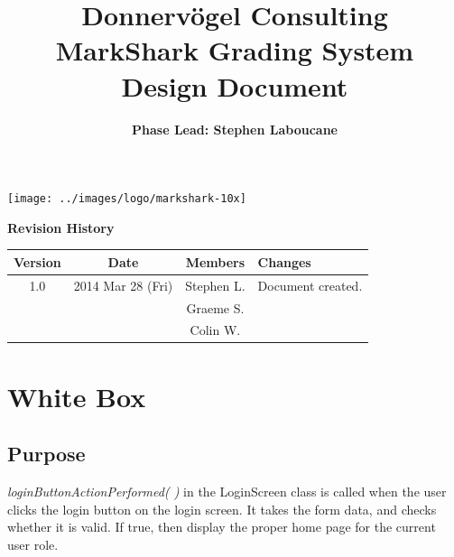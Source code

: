 \documentclass{article}
\begin{document}
\title{Donnervögel Consulting \\ MarkShark Grading System \\ Design Document}
\author{\textbf{Phase Lead: Stephen Laboucane}}
\maketitle
\centerline{\texttt{[image: ../images/logo/markshark-10x]}}
\clearpage

\textbf{Revision History}
\begin{center}
  \begin{tabular}{| c | c | c | l |}
    \hline
    Version & Date & Members & Changes\\
    \hline
    1.0 & 2014 Mar 28 (Fri) & Stephen L. & Document created.\\
    & & Graeme S. & \\
    & & Colin W. &\\
    \hline
  \end{tabular}
\end{center}
\clearpage

\tableofcontents
\clearpage

\section{White Box} 
\subsection{Purpose}
\textit{loginButtonActionPerformed( )} in the LoginScreen class is called when the user clicks the login button on the login screen.  It takes the form data, and checks whether it is valid.  If true, then display the proper home page for the current user role.
\end{document}
